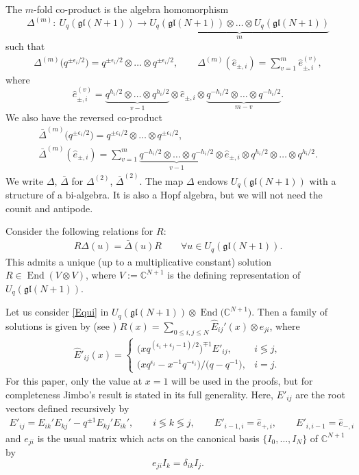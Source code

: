 \documentclass[11pt]{article}
\numberwithin{equation}{section}
\numberwithin{equation}{section}
\newcommand{\C}{{\mathbb C}}
\DeclareMathOperator{\End}{End}
\newcommand{\Uqgl}{{U_q(\mathfrak{gl}(N+1))}}
\begin{document}
The $m$-fold co-product is the algebra homomorphism \[\Delta^{(m)}\colon \ \Uqgl \rightarrow \underbrace{\Uqgl \otimes \dots \otimes \Uqgl}_{m} \]
such that \begin{gather}
 \Delta^{(m)}\big (q^{\pm \epsilon_i/2}\big)= q^{\pm \epsilon_i/2} \otimes \dots \otimes q^{\pm \epsilon_i/2},\qquad
 \Delta^{(m)} (\hat{e}_{\pm ,i} ) =\sum_{v=1}^{m} \hat{e}^{(v)}_{\pm ,i} ,\label{qerel}
\end{gather}
where
\[
\hat{e}^{(v)}_{\pm ,i} = \underbrace{q^{h_i/2} \otimes \dots \otimes q^{h_i/2}}_{v-1} \otimes \hat{e}_{\pm ,i} \otimes \underbrace{ q^{-h_i/2} \otimes \dots \otimes q^{-h_i/2}}_{m-v}.
\]
 We also have the reversed co-product
 \begin{gather*}
 \bar{\Delta}^{(m)} \big(q^{\pm \epsilon_i/2}\big)= q^{\pm \epsilon_i/2} \otimes \dots \otimes q^{\pm \epsilon_i/2}, \\
 \bar{\Delta}^{(m)} (\hat{e}_{\pm, i})= \sum_{v=1}^{m} \underbrace{q^{-h_i/2} \otimes \dots \otimes q^{-h_i/2}}_{v-1} \otimes \hat{e}_{\pm, i} \otimes q^{h_i/2} \otimes \dots \otimes q^{h_i/2}.
 \end{gather*}
We write $\Delta$, $\bar{\Delta}$ for $\Delta^{(2)}$, $\bar{\Delta}^{(2)}$. The map $ \Delta $ endows $ \Uqgl $ with a structure of a bi-algebra. It is also a Hopf algebra, but we will not need the counit and antipode.

Consider the following relations for $R$:
\begin{gather}
 R \Delta(u) = \bar{\Delta}(u) R \qquad \forall u\in \Uqgl. \label{Equi}
\end{gather}
 This admits a unique (up to a multiplicative constant) solution
$ R \in \End (V\otimes V) $, where $ V:=\mathbb{C}^{N+1} $ is the defining representation of $ \Uqgl $.

 Let us consider \eqref{Equi} in $ \Uqgl \otimes \End \big(\C^{N+1}\big) $. Then a family of solutions is given by (see \cite{Jimbo1986}) $R(x)= \sum_{0 \leq i,j \leq N} \hat{E}_{ij}'(x) \otimes e_{ji} $, where
 \begin{gather*} %
 \hat{E}'_{ij}(x) = \begin{cases}
 \big(x q^{(\epsilon_i+\epsilon_j-1)/2}\big)^{\mp 1} {E}'_{ij} , & i \lessgtr j,\\
 \big(xq^{\epsilon_i}- x^{-1}q^{- \epsilon_i}\big)/\big(q-q^{-1}\big), & i=j.
 \end{cases}
 \end{gather*}
 For this paper, only the value at $x=1$ will be used in the proofs, but for completeness Jimbo's result is stated in its full generality. Here, $ E'_{ij} $ are the root vectors defined recursively by
 \begin{gather*}
E'_{ij}= E_{ik}'E_{kj}' -q^{\pm 1} E_{kj}'E_{ik}',\qquad i \lessgtr k \lessgtr j, \qquad E'_{i-1,i} = \hat{e}_{+,i}, \qquad E'_{i,i-1} = \hat{e}_{-,i}
\end{gather*}
and $e_{ji}$ is the usual matrix which acts on the canonical basis $\{I_0,\dots,I_N\}$ of $\mathbb{C}^{N+1}$ by
\[
e_{ji}I_k = \delta_{ik} I_j.
\]
\end{document}
